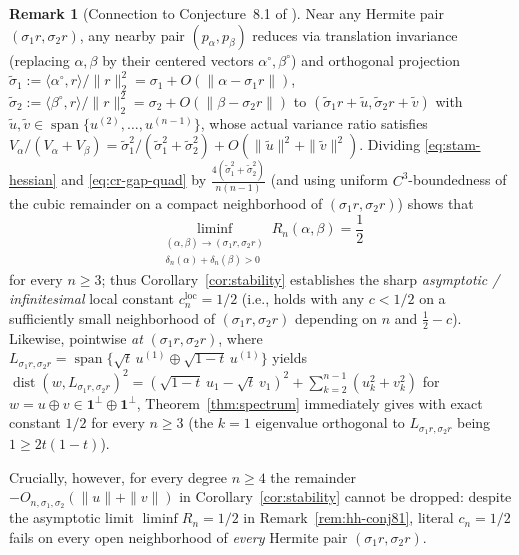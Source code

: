 \documentclass[11pt,a4paper]{article}
\theoremstyle{definition}
\newtheorem{remark}[theorem]{Remark}
\DeclareMathOperator{\Span}{span}
\newcommand{\one}{\mathbf{1}}
\begin{document}
\begin{remark}[Connection to Conjecture~8.1 of \cite{HH2026}]
Near any Hermite pair $(\sigma_1 r, \sigma_2 r)$, any nearby pair $(p_\alpha, p_\beta)$ reduces via translation invariance (replacing $\alpha, \beta$ by their centered vectors $\alpha^\circ, \beta^\circ$) and orthogonal projection $\tilde{\sigma}_1 := \langle \alpha^\circ, r\rangle / \|r\|_2^2 = \sigma_1 + O(\|\alpha - \sigma_1 r\|)$, $\tilde{\sigma}_2 := \langle \beta^\circ, r\rangle / \|r\|_2^2 = \sigma_2 + O(\|\beta - \sigma_2 r\|)$ to $(\tilde{\sigma}_1 r + \tilde{u}, \tilde{\sigma}_2 r + \tilde{v})$ with $\tilde{u}, \tilde{v} \in \Span\{u^{(2)},\dots,u^{(n-1)}\}$, whose actual variance ratio satisfies $V_\alpha/(V_\alpha + V_\beta) = \tilde{\sigma}_1^2/(\tilde{\sigma}_1^2 + \tilde{\sigma}_2^2) + O(\|\tilde{u}\|^2 + \|\tilde{v}\|^2)$. Dividing \eqref{eq:stam-hessian} and \eqref{eq:cr-gap-quad} by $\frac{4(\tilde{\sigma}_1^2 + \tilde{\sigma}_2^2)}{n(n-1)}$ (and using uniform $C^3$-boundedness of the cubic remainder on a compact neighborhood of $(\sigma_1 r, \sigma_2 r)$) shows that
\[
\liminf_{\substack{(\alpha,\beta)\to(\sigma_1 r,\sigma_2 r) \\ \delta_n(\alpha)+\delta_n(\beta)>0}} R_n(\alpha,\beta) = \frac{1}{2}
\]
for every $n \ge 3$; thus Corollary~\ref{cor:stability} establishes the sharp \emph{asymptotic / infinitesimal} local constant $c_n^{\mathrm{loc}} = 1/2$ (i.e., \cite[eq.~(101)]{HH2026} holds with any $c < 1/2$ on a sufficiently small neighborhood of $(\sigma_1 r,\sigma_2 r)$ depending on $n$ and $\frac{1}{2}-c$). Likewise, pointwise \emph{at} $(\sigma_1 r, \sigma_2 r)$, where $L_{\sigma_1 r, \sigma_2 r} = \Span\{\sqrt{t}\, u^{(1)} \oplus \sqrt{1-t}\, u^{(1)}\}$ yields $\operatorname{dist}(w, L_{\sigma_1 r, \sigma_2 r})^2 = (\sqrt{1-t}\,u_1 - \sqrt{t}\,v_1)^2 + \sum_{k=2}^{n-1}(u_k^2 + v_k^2)$ for $w = u \oplus v \in \one^\perp \oplus \one^\perp$, Theorem~\ref{thm:spectrum} immediately gives \cite[eq.~(100)]{HH2026} with exact constant $1/2$ for every $n \ge 3$ (the $k=1$ eigenvalue orthogonal to $L_{\sigma_1 r,\sigma_2 r}$ being $1 \ge 2t(1-t)$).
\end{remark}

Crucially, however, for every degree $n \ge 4$ the remainder $-O_{n,\sigma_1,\sigma_2}(\|u\|+\|v\|)$ in Corollary~\ref{cor:stability} cannot be dropped: despite the asymptotic limit $\liminf R_n = 1/2$ in Remark~\ref{rem:hh-conj81}, literal $c_n = 1/2$ fails on every open neighborhood of \emph{every} Hermite pair $(\sigma_1 r, \sigma_2 r)$.
\end{document}
